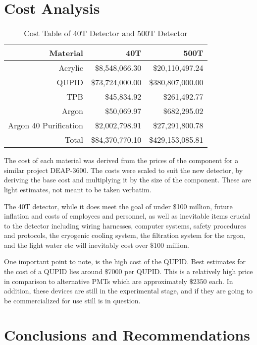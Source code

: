 \documentclass[11pt,a4paper,oneside]{report}
\begin{document}
\chapter{Cost Analysis}
\begin{table}[htbp]
  \centering
  \caption{Cost Table of 40T Detector and 500T Detector}
    \begin{tabular}{rrr}
 \hline
    Material & 40T   & 500T \\
    \hline
    Acrylic & \$8,548,066.30 & \$20,110,497.24 \\
    QUPID & \$73,724,000.00 & \$380,807,000.00 \\
    TPB   & \$45,834.92 & \$261,492.77 \\
    Argon & \$50,069.97 & \$682,295.02 \\
    Argon 40 Purification  & \$2,002,798.91 & \$27,291,800.78 \\ \hline \hline
    Total & \$84,370,770.10 & \$429,153,085.81 \\
\hline \hline
    \end{tabular}%
\end{table}%

The cost of each material was derived from the prices of the component for a similar project DEAP-3600. The costs were scaled to suit the new detector, by deriving the base cost and multiplying it by the size of the component. These are light estimates, not meant to be taken verbatim. 

The 40T detector, while it does meet the goal of under $\$$100 million,  future inflation and costs of employees and personnel, as well as inevitable items crucial to the detector including wiring harnesses, computer systems, safety procedures and protocols, the cryogenic cooling system, the filtration system for the argon, and the light water etc will inevitably cost over $\$$100 million.

One important point to note, is the high cost of the QUPID. Best estimates for the cost of a QUPID lies around $\$$7000 per QUPID. This is a relatively high price in comparison to alternative PMTs which are approximately $\$$2350 each. In addition, these devices are still in the experimental stage, and if they are going to be commercialized for use still is in question. 


\newpage
\chapter{Conclusions and Recommendations}
\end{document}
